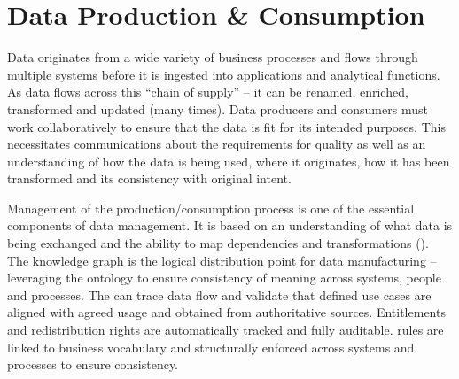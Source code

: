 \section{Data Production \& Consumption}\label{sec:ekgmm-b-4-3} %

Data originates from a wide variety of business processes and flows through multiple systems before it is
ingested into applications and analytical functions.
As data flows across this “chain of supply” -- it can be renamed, enriched, transformed and updated (many times).
Data producers and consumers must work collaboratively to ensure that the data is fit for its intended purposes.
This necessitates communications about the requirements for quality as well as an understanding of
how the data is being used, where it originates, how it has been transformed and its consistency with original intent.

\ekgmmContextSection

Management of the production/consumption process is one of the essential components of data management.
It is based on an understanding of what data is being exchanged and the ability to map dependencies and
transformations ().
The knowledge graph is the logical distribution point for data manufacturing -- leveraging the ontology to ensure
consistency of meaning across systems, people and processes.
The  can trace data flow and validate that defined use cases are aligned with agreed usage and
obtained from authoritative sources.
Entitlements and redistribution rights are automatically tracked and fully auditable.
 rules are linked to business vocabulary and structurally enforced across systems and processes
to ensure consistency.

\kgmmcorequestionssection

